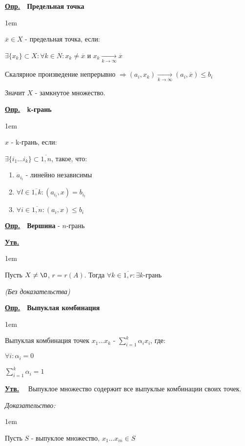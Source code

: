 \documentclass[11pt]{article}
\newenvironment{inlinedf}[1]{
  \underline{\textbf{Опр.}}\ \ \textbf{#1} - }{
}
\newenvironment{df}[1]{
  \underline{\textbf{Опр.}}\ \ \textbf{#1}
  
  \begin{adjustwidth}{1em}{}
}{
  \end{adjustwidth}
}
\newenvironment{proof}{
  \textit{Доказательство:}
    
  \begin{adjustwidth}{1em}{}
}{
  \end{adjustwidth}
}
\newenvironment{statement}{
  \underline{\textbf{Утв.}}\ \ }{
  
}
\newenvironment{mlstatement}[1]{
  \underline{\textbf{Утв.}}\ \ \textbf{#1} 
  
  \begin{adjustwidth}{1em}{}
}{
  \end{adjustwidth}
}
\begin{document}
\begin{sloppypar}
\begin{df}{Предельная точка}
  $\overline{x} \in X$ - предельная точка, если:
  
  $\exists \{x_k\} \subset X: \forall k \in N: x_k \neq \overline{x}$ и $x_k \xrightarrow[k \to \infty]{} \overline{x}$
\end{df}

Скалярное произведение непрерывно $\Rightarrow (a_i, x_k) \xrightarrow[k \to \infty]{} (a_i, \overline{x}) \leq b_i$

Значит $X$ - замкнутое множество.

\begin{df}{k-грань}
  $x$ - k-грань, если:

  $\exists \{i_1 \dots i_k\} \subset \overline{1, n}$, такое, что:
  
  \begin{enumerate}
    \item $a_{i_l}$ - линейно независимы
    \item $\forall l \in \overline{1, k}: (a_{i_l}, x) = b_{i_l}$
    \item $\forall i \in \overline{1, n}: (a_i, x) \leq b_i$
  \end{enumerate}
\end{df}

\begin{inlinedf}{Вершина}
  $n$-грань
\end{inlinedf}

\begin{mlstatement}{}
  Пусть $X \neq \O$, $r = r(A)$. Тогда $\forall k \in \overline{1, r}: \exists k$-грань
  
  \textit{(Без доказательства)}
\end{mlstatement}


\begin{df}{Выпуклая комбинация}
  Выпуклая комбинация точек $x_1 \dots x_k$ - $\sum_{i = 1}^k \alpha_i x_i$, где:
  
  $\forall i: \alpha_i = 0$
  
  $\sum_{i = 1}^k \alpha_i = 1$
\end{df}

\begin{statement}
  Выпуклое множество содержит все выпуклые комбинации своих точек.
\end{statement}
\begin{proof}
  Пусть $S$ - выпуклое множество, $x_1 \dots x_m \in S$
  

\end{proof}
\end{sloppypar}
\end{document}
